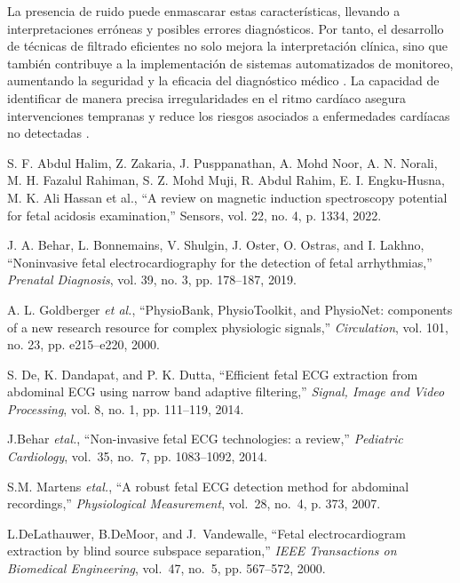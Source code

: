 \documentclass[10pt, conference]{IEEEtran}
\begin{document}
La presencia de ruido puede enmascarar estas características, llevando a interpretaciones erróneas y posibles errores diagnósticos. Por tanto, el desarrollo de técnicas de filtrado eficientes no solo mejora la interpretación clínica, sino que también contribuye a la implementación de sistemas automatizados de monitoreo, aumentando la seguridad y la eficacia del diagnóstico médico \cite{de2014efficient}. La capacidad de identificar de manera precisa irregularidades en el ritmo cardíaco asegura intervenciones tempranas y reduce los riesgos asociados a enfermedades cardíacas no detectadas \cite{behar2014non}.

\begin{thebibliography}{00}

	 S. F. Abdul Halim, Z. Zakaria, J. Pusppanathan, A. Mohd Noor, A. N. Norali, M. H. Fazalul Rahiman, S. Z. Mohd Muji, R. Abdul Rahim, E. I. Engku-Husna, M. K. Ali Hassan et al., “A review on magnetic induction spectroscopy potential for fetal acidosis examination,” Sensors, vol. 22, no. 4, p. 1334, 2022.

	 J. A. Behar, L. Bonnemains, V. Shulgin, J. Oster, O. Ostras, and I. Lakhno, ``Noninvasive fetal electrocardiography for the detection of fetal arrhythmias,'' \textit{Prenatal Diagnosis}, vol. 39, no. 3, pp. 178--187, 2019.

	 A. L. Goldberger \textit{et al.}, ``PhysioBank, PhysioToolkit, and PhysioNet: components of a new research resource for complex physiologic signals,'' \textit{Circulation}, vol. 101, no. 23, pp. e215--e220, 2000.

	 S. De, K. Dandapat, and P. K. Dutta, ``Efficient fetal ECG extraction from abdominal ECG using narrow band adaptive filtering,'' \textit{Signal, Image and Video Processing}, vol. 8, no. 1, pp. 111--119, 2014.

	 J.Behar \emph{etal.}, ``Non-invasive fetal ECG technologies: a review,'' \emph{Pediatric Cardiology}, vol.~35, no.~7, pp. 1083--1092, 2014.

	 S.M. Martens \emph{etal.}, ``A robust fetal ECG detection method for abdominal recordings,'' \emph{Physiological Measurement}, vol.~28, no.~4, p. 373, 2007.

	 L.DeLathauwer, B.DeMoor, and J.~Vandewalle, ``Fetal electrocardiogram extraction by blind source subspace separation,'' \emph{IEEE Transactions on Biomedical Engineering}, vol.~47, no.~5, pp. 567--572, 2000.


\end{thebibliography}
\end{document}

